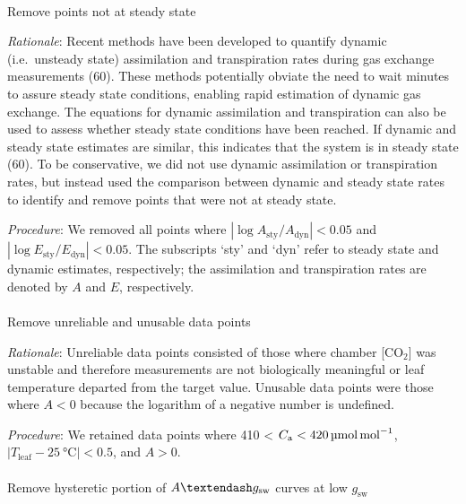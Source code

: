 \documentclass[
  letterpaper,
  DIV=11,
  numbers=noendperiod]{scrartcl}
\makeatletter
\let\oldparagraph\paragraph
\renewcommand{\paragraph}{
    \@ifstar
      \xxxParagraphStar
      \xxxParagraphNoStar
  }
\newcommand{\xxxParagraphStar}[1]{\oldparagraph*{#1}\mbox{}}
\newcommand{\xxxParagraphNoStar}[1]{\oldparagraph{#1}\mbox{}}
\newcommand{\agcurve}{$A \textendash g_\text{sw}$}
\newcommand{\cabetween}[2]{#1 < $C_\mathrm{a} < \qty{#2}{\micro\mol\raiseto{-1}\mol}$}
\newcommand{\gsw}{$g_\text{sw}$}
\makeatother
\begin{document}
\paragraph{Remove points not at steady
state}\label{remove-points-not-at-steady-state}

\emph{Rationale}: Recent methods have been developed to quantify dynamic
(i.e.~unsteady state) assimilation and transpiration rates during gas
exchange measurements (60). These methods potentially obviate the need
to wait minutes to assure steady state conditions, enabling rapid
estimation of dynamic gas exchange. The equations for dynamic
assimilation and transpiration can also be used to assess whether steady
state conditions have been reached. If dynamic and steady state
estimates are similar, this indicates that the system is in steady state
(60). To be conservative, we did not use dynamic assimilation or
transpiration rates, but instead used the comparison between dynamic and
steady state rates to identify and remove points that were not at steady
state.

\emph{Procedure}: We removed all points where
\(\left| \log{A_\mathrm{sty} / A_\mathrm{dyn}} \right| < 0.05\) and
\(\left| \log{E_\mathrm{sty} / E_\mathrm{dyn}} \right| < 0.05\). The
subscripts `sty' and `dyn' refer to steady state and dynamic estimates,
respectively; the assimilation and transpiration rates are denoted by
\(A\) and \(E\), respectively.

\paragraph{Remove unreliable and unusable data
points}\label{remove-unreliable-and-unusable-data-points}

\emph{Rationale}: Unreliable data points consisted of those where
chamber {[}CO\(_2\){]} was unstable and therefore measurements are not
biologically meaningful or leaf temperature departed from the target
value. Unusable data points were those where \(A < 0\) because the
logarithm of a negative number is undefined.

\emph{Procedure}: We retained data points where \cabetween{410}{420},
\(\left| T_\mathrm{leaf} - \qty{25}{\degreeCelsius} \right| < 0.5\), and
\(A> 0\).

\paragraph{\texorpdfstring{Remove hysteretic portion of \agcurve{}
curves at low
\gsw{}}{Remove hysteretic portion of  curves at low }}\label{remove-hysteretic-portion-of-curves-at-low}
\end{document}
